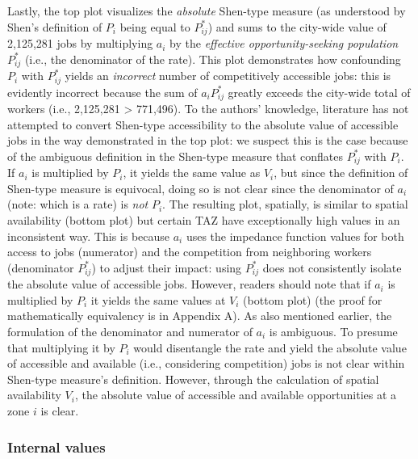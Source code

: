 \documentclass[10pt,letterpaper]{article}
\begin{document}
Lastly, the top plot visualizes the \emph{absolute} Shen-type measure
(as understood by Shen's definition of \(P_i\) being equal to
\(P_{ij}^*\)) and sums to the city-wide value of 2,125,281 jobs by
multiplying \(a_i\) by the \emph{effective opportunity-seeking
population} \(P_{ij}^*\) (i.e., the denominator of the rate). This plot
demonstrates how confounding \(P_i\) with \(P_{ij}^*\) yields an
\emph{incorrect} number of competitively accessible jobs: this is
evidently incorrect because the sum of \(a_iP_{ij}^*\) greatly exceeds
the city-wide total of workers (i.e., 2,125,281 \textgreater{} 771,496).
To the authors' knowledge, literature has not attempted to convert
Shen-type accessibility to the absolute value of accessible jobs in the
way demonstrated in the top plot: we suspect this is the case because of
the ambiguous definition in the Shen-type measure that conflates
\(P_{ij}^*\) with \(P_i\). If \(a_i\) is multiplied by \(P_i\), it
yields the same value as \(V_i\), but since the definition of Shen-type
measure is equivocal, doing so is not clear since the denominator of
\(a_i\) (note: which is a rate) is \emph{not} \(P_i\). The resulting
plot, spatially, is similar to spatial availability (bottom plot) but
certain TAZ have exceptionally high values in an inconsistent way. This
is because \(a_i\) uses the impedance function values for both access to
jobs (numerator) and the competition from neighboring workers
(denominator \(P_{ij}^*\)) to adjust their impact: using \(P_{ij}^*\)
does not consistently isolate the absolute value of accessible jobs.
However, readers should note that if \(a_i\) is multiplied by \(P_i\) it
yields the same values at \(V_i\) (bottom plot) (the proof for
mathematically equivalency is in Appendix A). As also mentioned earlier,
the formulation of the denominator and numerator of \(a_i\) is
ambiguous. To presume that multiplying it by \(P_i\) would disentangle
the rate and yield the absolute value of accessible and available (i.e.,
considering competition) jobs is not clear within Shen-type measure's
definition. However, through the calculation of spatial availability
\(V_i\), the absolute value of accessible and available opportunities at
a zone \(i\) is clear.

\hypertarget{internal-values}{%
\subsubsection{Internal values}\label{internal-values}}
\end{document}
